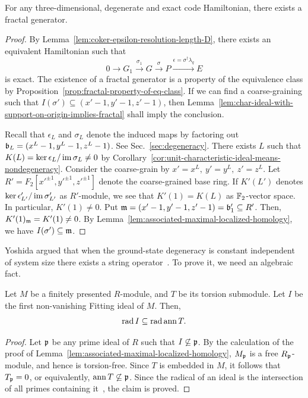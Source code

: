 \begin{theorem}
For any three-dimensional, degenerate and exact code Hamiltonian,
there exists a fractal generator.
\label{thm:fractal-exists-in-3D}
\end{theorem}
\begin{proof}
By Lemma~\ref{lem:coker-epsilon-resolution-length-D}, there exists an equivalent Hamiltonian
such that
\[
  0 \to G_1 \xrightarrow{\sigma_1} G \xrightarrow{\sigma} P \xrightarrow{\epsilon=\sigma^\dagger \lambda_q} E
\]
is exact. The existence of a fractal generator is a property of the equivalence class
by Proposition~\ref{prop:fractal-property-of-eq-class}.
If we can find a coarse-graining such that $I(\sigma') \subseteq (x'-1,y'-1,z'-1)$,
then Lemma~\ref{lem:char-ideal-with-support-on-origin-implies-fractal} shall imply the conclusion.


Recall that $\epsilon_L$ and $\sigma_L$ denote the induced maps
by factoring out $\mathfrak{b}_L = (x^L-1,y^L-1,z^L-1)$. See Sec.~\ref{sec:degeneracy}.
There exists $L$ such that $K(L) = \ker \epsilon_L / \mathop{\mathrm{im}}\nolimits \sigma_L \ne 0$ by 
Corollary~\ref{cor:unit-characteristic-ideal-means-nondegeneracy}.
Consider the coarse-grain by $x'=x^L,~ y'=y^L,~ z'=z^L$.
Let $R' = F_2[x'^{\pm 1}, y'^{\pm 1}, z'^{\pm 1}]$ denote the coarse-grained base ring.
If $K'(L')$ denotes $\ker \epsilon'_{L'} / \mathop{\mathrm{im}}\nolimits \sigma'_{L'}$ as $R'$-module,
we see that $K'(1) = K(L)$ as $\mathbb{F}_2$-vector space.
In particular, $K'(1) \ne 0$.
Put $\mathfrak{m} = (x'-1,y'-1,z'-1) = \mathfrak{b}'_1 \subseteq R'$.
Then, $K'(1)_{\mathfrak{m}} = K'(1) \ne 0$.
By Lemma~\ref{lem:associated-maximal-localized-homology},
we have $I(\sigma') \subseteq \mathfrak{m}$.
\end{proof}

Yoshida argued that when the ground-state degeneracy is constant independent of system size
there exists a string operator~\cite{Yoshida2011feasibility}.
To prove it, we need an algebraic fact.
\begin{prop}
Let $M$ be a finitely presented $R$-module, and $T$ be its torsion submodule.
Let $I$ be the first non-vanishing Fitting ideal of $M$.
Then,
\[
 \mathop{\mathrm{rad}}\nolimits I \subseteq \mathop{\mathrm{rad}}\nolimits \mathop{\mathrm{ann}}\nolimits T .
\]
\label{prop:support-torsion-fitting-ideal}
\end{prop}
\begin{proof}
Let $\mathfrak{p}$ be any prime ideal of $R$ such that $I \not\subseteq \mathfrak{p}$.
By the calculation of the proof of Lemma~\ref{lem:associated-maximal-localized-homology},
$M_{\mathfrak{p}}$ is a free $R_{\mathfrak{p}}$-module, and hence is torsion-free.
Since $T$ is embedded in $M$, it follows that $T_{\mathfrak{p}} = 0$, or equivalently, $\mathop{\mathrm{ann}}\nolimits T \not\subseteq \mathfrak{p}$.
Since the radical of an ideal is the intersection of all primes containing it~\cite[Proposition 1.8]{AtiyahMacDonald},
the claim is proved.
\end{proof}

